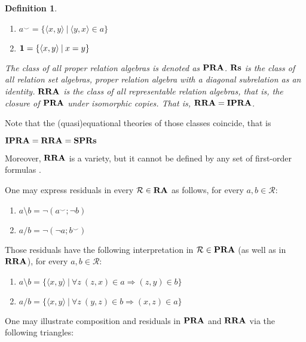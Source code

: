 \documentclass[a4paper]{article}
\theoremstyle{defin}
\newtheorem{defin}{Definition}
\theoremstyle{theorem}
\theoremstyle{prop}
\theoremstyle{lemma}
\theoremstyle{ex}
\theoremstyle{col}
\begin{document}
\begin{defin}
\begin{enumerate}
\begin{enumerate}
    \item $a^{\smile} = \{ \langle x, y \rangle \: | \: \langle y, x \rangle \in a \}$
    \item ${\bf 1} = \{ \langle x, y \rangle \: | \: x = y \}$
    \end{enumerate}
      The class of all proper relation algebras is denoted as ${\bf PRA}$. ${\bf Rs}$ is the class of all relation set algebras, proper relation algebra with a diagonal subrelation as an identity. ${\bf RRA}$ is the class of all representable relation algebras, that is, the closure of ${\bf PRA}$ under isomorphic copies. That is,
      ${\bf RRA} = {\bf IPRA}$.
  \end{enumerate}
\end{defin}
Note that the (quasi)equational theories of those classes coincide, that is
\begin{center}
  ${\bf IPRA} = {\bf RRA} = {\bf SP}{\bf Rs}$
\end{center}
Moreover, ${\bf RRA}$ is a variety, but it cannot be defined by any set of first-order formulas \cite{monk1964representable}.

One may express residuals in every $\mathcal{R} \in {\bf RA}$ as follows, for every $a, b \in \mathcal{R}$:

\begin{enumerate}
  \item $a \setminus b = \neg (a^{\smile} ; \neg b)$
  \item $a / b = \neg (\neg a ; b^{\smile})$
\end{enumerate}

Those residuals have the following interpretation in $\mathcal{R} \in {\bf PRA}$ (as well as in ${\bf RRA}$), for every $a, b \in \mathcal{R}$:
\begin{enumerate}
  \item $a \setminus b = \{ \langle x, y \rangle \: | \: \forall z \: (z, x) \in a \Rightarrow (z, y) \in b \}$
  \item $a / b = \{ \langle x, y \rangle \: | \: \forall z \: (y, z) \in b \Rightarrow (x, z) \in a \}$
\end{enumerate}
One may illustrate composition and residuals in ${\bf PRA}$ and ${\bf RRA}$ via the following triangles:

\end{document}
